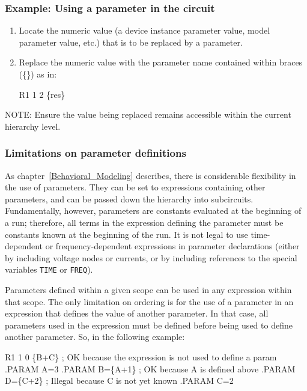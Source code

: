 \subsubsection{Example:  Using a parameter in the circuit}
\begin{enumerate}
\item Locate the numeric value (a device instance parameter value, model parameter value, etc.) that is to be replaced by a parameter.  
\item Replace the numeric value with the parameter name contained within braces
  (\{\}) as in:
\begin{vquote}
R1 1 2 \{res\}
\end{vquote}
\end{enumerate}

NOTE:	Ensure the value being replaced remains accessible within the current hierarchy level.

\subsubsection{Limitations on parameter definitions}

As chapter~\ref{Behavioral_Modeling} describes, there is considerable flexibility in the use of parameters. They can be set to expressions containing other parameters, and can be passed down the hierarchy into subcircuits. Fundamentally, however, parameters are constants evaluated at the beginning of a run; therefore, all terms in the expression defining the parameter must be constants known at the beginning of the run. It is not legal to use time-dependent or frequency-dependent expressions in parameter declarations (either by including voltage nodes or currents, or by including references to the special variables \texttt{TIME} or \texttt{FREQ}).

Parameters defined within a given scope can be used in any expression within that scope. The only limitation on ordering is for the use of a parameter in an expression that defines the value of another parameter. In that case, all parameters used in the expression must be defined before being used to define another parameter. So, in the following example:

  \begin{vquote}
R1  1  0  \{B+C\} ; OK because the expression is not used to define a param
.PARAM A=3
.PARAM B=\{A+1\}  ; OK because A is defined above
.PARAM D=\{C+2\}  ; Illegal because C is not yet known
.PARAM C=2
\end{vquote}

